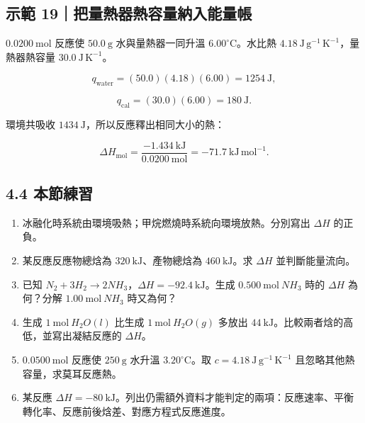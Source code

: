 \documentclass[11pt,a4paper]{article}
\providecommand{\tightlist}{%
  \setlength{\itemsep}{0pt}\setlength{\parskip}{0pt}}
\begin{document}
\begin{HandoutWorkedExample}

\subsection{示範 19｜把量熱器熱容量納入能量帳}\label{ux793aux7bc4-19ux628aux91cfux71b1ux5668ux71b1ux5bb9ux91cfux7d0dux5165ux80fdux91cfux5e33}

\(0.0200\ \mathrm{mol}\) 反應使 \(50.0\ \mathrm g\) 水與量熱器一同升溫 \(6.00^\circ\mathrm C\)。水比熱 \(4.18\ \mathrm{J\,g^{-1}\,K^{-1}}\)，量熱器熱容量 \(30.0\ \mathrm{J\,K^{-1}}\)。

\[
q_{\mathrm{water}}=(50.0)(4.18)(6.00)=1254\ \mathrm J,
\]

\[
q_{\mathrm{cal}}=(30.0)(6.00)=180\ \mathrm J.
\]

環境共吸收 \(1434\ \mathrm J\)，所以反應釋出相同大小的熱：

\[
\Delta H_{\mathrm{mol}}
=\frac{-1.434\ \mathrm{kJ}}{0.0200\ \mathrm{mol}}
=-71.7\ \mathrm{kJ\,mol^{-1}}.
\]

\end{HandoutWorkedExample}

\subsection{4.4 本節練習}\label{ux672cux7bc0ux7df4ux7fd2-3}

\begin{enumerate}
\def\labelenumi{\arabic{enumi}.}
\tightlist
\item
  冰融化時系統由環境吸熱；甲烷燃燒時系統向環境放熱。分別寫出 \(\Delta H\) 的正負。
\item
  某反應反應物總焓為 \(320\ \mathrm{kJ}\)、產物總焓為 \(460\ \mathrm{kJ}\)。求 \(\Delta H\) 並判斷能量流向。
\item
  已知 \(N_2+3H_2\rightarrow2NH_3\)，\(\Delta H=-92.4\ \mathrm{kJ}\)。生成 \(0.500\ \mathrm{mol}\ NH_3\) 時的 \(\Delta H\) 為何？分解 \(1.00\ \mathrm{mol}\ NH_3\) 時又為何？
\item
  生成 \(1\ \mathrm{mol}\ H_2O(l)\) 比生成 \(1\ \mathrm{mol}\ H_2O(g)\) 多放出 \(44\ \mathrm{kJ}\)。比較兩者焓的高低，並寫出凝結反應的 \(\Delta H\)。
\item
  \(0.0500\ \mathrm{mol}\) 反應使 \(250\ \mathrm g\) 水升溫 \(3.20^\circ\mathrm C\)。取 \(c=4.18\ \mathrm{J\,g^{-1}\,K^{-1}}\) 且忽略其他熱容量，求莫耳反應熱。
\item
  某反應 \(\Delta H=-80\ \mathrm{kJ}\)。列出仍需額外資料才能判定的兩項：反應速率、平衡轉化率、反應前後焓差、對應方程式反應進度。
\end{enumerate}
\end{document}
